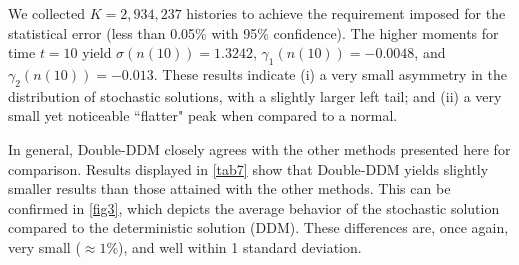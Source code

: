 \documentclass[preprint,12pt,authoryear]{elsarticle}
\begin{document}
\begin{table}[H]
\caption{Neutron density $n(t)$ with sinusoidal reactivity $\rho(t)=0.00073\sin(t)$.}\label{tab7}
\end{table}
We collected $K=2,934,237$ histories to achieve the requirement imposed for the statistical error (less than 0.05\% with 95\% confidence).
The higher moments for time $t=10$ yield $\sigma(n(10))= 1.3242$, $\gamma_1(n(10))=-0.0048$, and $\gamma_2(n(10))=-0.013$. These results indicate (i) a very small asymmetry in the distribution of stochastic solutions, with a slightly larger left tail; and (ii) a very small yet noticeable  ``flatter" peak when compared to a normal. 

In general, Double-DDM closely agrees with the other methods presented here for comparison.
Results displayed in \cref{tab7} show that Double-DDM  yields slightly smaller results than those attained with the other methods.
This can be confirmed in \cref{fig3}, which depicts the average behavior of the stochastic solution compared to the deterministic solution (DDM).
These differences are, once again, very small ($\approx 1\%$), and well within 1 standard deviation.
\end{document}
